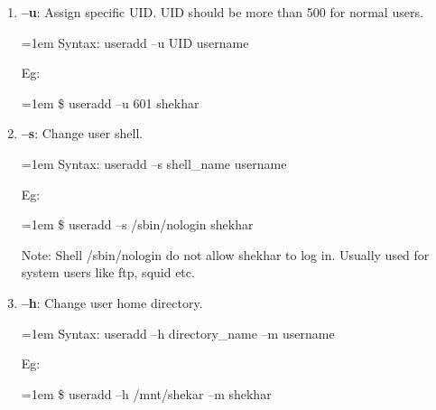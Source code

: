 \begin{flushleft}
\begin{enumerate}[label=(\alph*)]
			\item \textbf{–u}: Assign specific UID. UID should be more than 500 for normal users.
			\bigskip
			\begin{tcolorbox}[breakable,notitle,boxrule=0pt,colback=pink,colframe=pink]
				\color{black}
				\font=1em
				Syntax: useradd –u UID username
				\font=4pt
			\end{tcolorbox}
			Eg:
			\bigskip
			\begin{tcolorbox}[breakable,notitle,boxrule=-0pt,colback=black,colframe=black]
				\color{green}
				\font=1em
				\$ useradd –u 601 shekhar
				\font=4pt
			\end{tcolorbox}
			

			\item \textbf{–s}: Change user shell.
			\bigskip
			\begin{tcolorbox}[breakable,notitle,boxrule=0pt,colback=pink,colframe=pink]
				\color{black}
				\font=1em
				Syntax: useradd –s shell\_name username
				\font=4pt
			\end{tcolorbox}
			Eg:
			\bigskip
			\begin{tcolorbox}[breakable,notitle,boxrule=-0pt,colback=black,colframe=black]
				\color{green}
				\font=1em
				\$ useradd –s /sbin/nologin shekhar
				\font=4pt
			\end{tcolorbox}
			\bigskip
			\begin{tcolorbox}[breakable,notitle,boxrule=-0pt,colback=yellow,colframe=yellow]
				\color{black}
				Note: Shell /sbin/nologin do not allow shekhar to log in. Usually used for system users like ftp, squid etc.
			\end{tcolorbox}
			

			\item \textbf{–h}: Change user home directory.
			\bigskip
			\begin{tcolorbox}[breakable,notitle,boxrule=0pt,colback=pink,colframe=pink]
				\color{black}
				\font=1em
				Syntax: useradd –h directory\_name –m username
				\font=4pt
			\end{tcolorbox}
			Eg:
			\bigskip
			\begin{tcolorbox}[breakable,notitle,boxrule=-0pt,colback=black,colframe=black]
				\color{green}
				\font=1em
				\$ useradd –h /mnt/shekar –m shekhar
				\font=4pt
			\end{tcolorbox}
		\end{enumerate}


\end{flushleft}
